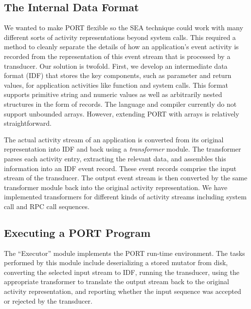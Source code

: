 \subsection{The Internal Data Format}

We wanted to make PORT flexible so the SEA technique
could
work with many different sorts of
activity representations beyond system calls.
This required a method to cleanly separate the details of how
an application's event activity is recorded from the representation of this event stream that is
processed by a transducer.
Our solution is twofold.  First, we develop an intermediate data format
(IDF) that
stores the key components, such as parameter and return values,
for application activities like function
and system calls.  This format supports primitive string and numeric
values as well as arbitrarily nested structures in the form of records.
The language and compiler currently do not support unbounded arrays. However, extending PORT with arrays is relatively straightforward.


The actual activity stream of an application is converted from its original representation into IDF and
back using a \emph{transformer} module. The transformer parses each activity entry,
extracting the relevant data, and assembles this information into an IDF
event record.  These event records comprise the input stream of the transducer. 
The output event stream is then converted by the same transformer module
back into the original activity representation. We have implemented transformers for different kinds of activity streams including system call and RPC call sequences.

\subsection{Executing a PORT Program}

The ``Executor'' module implements the PORT run-time environment.
The tasks performed by this module include deserializing a stored mutator from disk,
converting the selected input stream to IDF,
running the transducer, 
using the appropriate transformer to translate the output stream back to the original activity representation, and reporting whether the input sequence was
accepted or rejected by the transducer.

